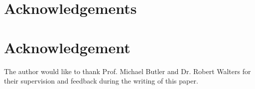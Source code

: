 \documentclass[12pt,journal,compsoc]{IEEEtran}
\begin{document}
\appendices



\ifCLASSOPTIONcompsoc
  \section*{Acknowledgements}
\else
  \section*{Acknowledgement}
\fi

The author would like to thank Prof. Michael Butler and Dr. Robert Walters for their supervision and feedback during the writing of this paper.


\ifCLASSOPTIONcaptionsoff
  \newpage
\fi




%


\end{document}
